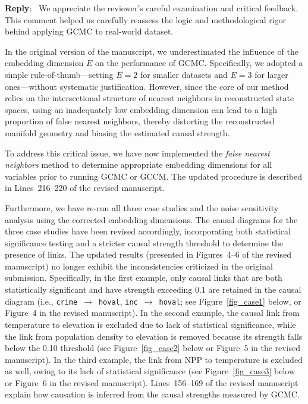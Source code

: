 \documentclass[11pt]{article}
\newcounter{reviewer}
\newenvironment{reply}
   {\medskip \noindent \color{blue} \begin{sf}\textbf{Reply}:\  }
   {\medskip \par \end{sf}}
\begin{document}
\begin{reply}
We appreciate the reviewer’s careful examination and critical feedback. This comment helped us carefully reassess the logic and methodological rigor behind applying GCMC to real-world dataset.

In the original version of the manuscript, we underestimated the influence of the embedding dimension $E$ on the performance of GCMC. Specifically, we adopted a simple rule-of-thumb—setting $E = 2$ for smaller datasets and $E = 3$ for larger ones—without systematic justification. However, since the core of our method relies on the intersectional structure of nearest neighbors in reconstructed state spaces, using an inadequately low embedding dimension can lead to a high proportion of false nearest neighbors\citep{kennel1992fnn,ma2017cme}, thereby distorting the reconstructed manifold geometry and biasing the estimated causal strength.

To address this critical issue, we have now implemented the \textit{false nearest neighbors} method to determine appropriate embedding dimensions \citep{kennel1992fnn} for all variables prior to running GCMC or GCCM. The updated procedure is described in Lines~216--220 of the revised manuscript.

Furthermore, we have re-run all three case studies and the noise sensitivity analysis using the corrected embedding dimensions. The causal diagrams for the three case studies have been revised accordingly, incorporating both statistical significance testing and a stricter causal strength threshold to determine the presence of links. The updated results (presented in Figures~4–6 of the revised manuscript) no longer exhibit the inconsistencies criticized in the original submission. Specifically, in the first example, only causal links that are both statistically significant and have strength exceeding 0.1 are retained in the causal diagram (i.e., \texttt{crime}~$\rightarrow$~\texttt{hoval}, \texttt{inc}~$\rightarrow$~\texttt{hoval}; see Figure~\ref{fig_case1} below, or Figure~4 in the revised manuscript). In the second example, the causal link from temperature to elevation is excluded due to lack of statistical significance, while the link from population density to elevation is removed because its strength falls below the 0.10 threshold (see Figure~\ref{fig_case2} below or Figure~5 in the revised manuscript). In the third example, the link from NPP to temperature is excluded as well, owing to its lack of statistical significance (see Figure~\ref{fig_case3} below or Figure~6 in the revised manuscript). Lines~156–169 of the revised manuscript explain how causation is inferred from the causal strengths measured by GCMC.


\end{reply}
\end{document}
